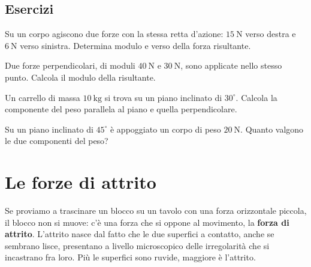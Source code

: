 \subsection{Esercizi}

\begin{esercizio}
Su un corpo agiscono due forze con la stessa retta d'azione: $\SI{15}{\newton}$ verso destra e $\SI{6}{\newton}$ verso sinistra. Determina modulo e verso della forza risultante.\\
\end{esercizio}

\begin{esercizio}
Due forze perpendicolari, di moduli $\SI{40}{\newton}$ e $\SI{30}{\newton}$, sono applicate nello stesso punto. Calcola il modulo della risultante.\\
\end{esercizio}

\begin{esercizio}
Un carrello di massa $\SI{10}{\kilo\gram}$ si trova su un piano inclinato di $30^\circ$. Calcola la componente del peso parallela al piano e quella perpendicolare.\\
\end{esercizio}

\begin{esercizio}
Su un piano inclinato di $45^\circ$ è appoggiato un corpo di peso $\SI{20}{\newton}$. Quanto valgono le due componenti del peso?\\
\end{esercizio}


\section{Le forze di attrito}

Se proviamo a trascinare un blocco su un tavolo con una forza orizzontale piccola, il blocco non si muove: c'è una forza che si oppone al movimento, la \textbf{forza di attrito}. L'attrito nasce dal fatto che le due superfici a contatto, anche se sembrano lisce, presentano a livello microscopico delle irregolarità che si incastrano fra loro. Più le superfici sono ruvide, maggiore è l'attrito.

